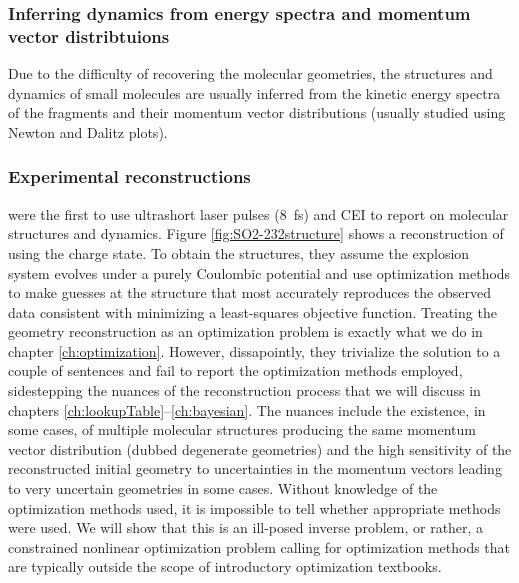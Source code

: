 
\subsubsection*{Inferring dynamics from energy spectra and momentum vector distribtuions}
Due to the difficulty of recovering the molecular geometries, the structures and dynamics of small molecules are usually inferred from the kinetic energy spectra of the fragments and their momentum vector distributions (usually studied using Newton and Dalitz plots).

\subsubsection*{Experimental reconstructions}
\citet{Legare05structure,Legare05dynamics} were the first to use ultrashort laser pulses (\SI{8}{\fs}) and CEI to report on molecular structures and dynamics. Figure \ref{fig:SO2-232structure} shows a reconstruction of  using the  charge state. To obtain the structures, they assume the explosion system evolves under a purely Coulombic potential and use optimization methods to make guesses at the structure that most accurately reproduces the observed data consistent with minimizing a least-squares objective function. Treating the geometry reconstruction as an optimization problem is exactly what we do in chapter \ref{ch:optimization}. However, dissapointly, they trivialize the solution to a couple of sentences and fail to report the optimization methods employed, sidestepping the nuances of the reconstruction process that we will discuss in chapters \ref{ch:lookupTable}--\ref{ch:bayesian}. The nuances include the existence, in some cases, of multiple molecular structures producing the same momentum vector distribution (dubbed degenerate geometries) and the high sensitivity of the reconstructed initial geometry to uncertainties in the momentum vectors leading to very uncertain geometries in some cases. Without knowledge of the optimization methods used, it is impossible to tell whether appropriate methods were used. We will show that this is an ill-posed inverse problem, or rather, a constrained nonlinear optimization problem calling for optimization methods that are typically outside the scope of introductory optimization textbooks.

